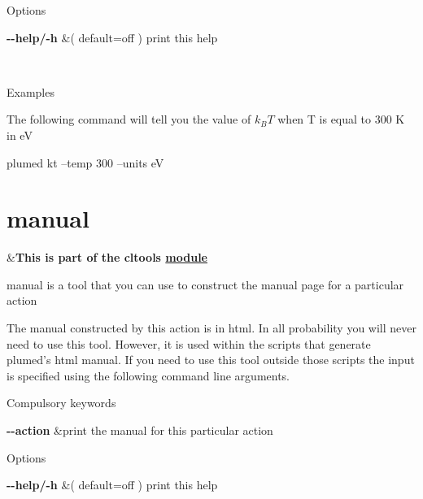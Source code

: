 \begin{DoxyParagraph}{Options}

\end{DoxyParagraph}
\begin{TabularC}{2}
\hline
{\bfseries  {\ttfamily -\/-\/help/-\/h} } &( default=off ) print this help  

\\
\end{TabularC}


\begin{DoxyParagraph}{Examples}

\end{DoxyParagraph}
The following command will tell you the value of $k_BT$ when T is equal to 300 K in e\+V

\begin{DoxyVerb}plumed kt --temp 300 --units eV
\end{DoxyVerb}
 \hypertarget{manual}{}\section{manual}\label{manual}
\begin{TabularC}{2}
\hline
&{\bfseries  This is part of the cltools \hyperlink{mymodules}{module }}   \\
\end{TabularC}
manual is a tool that you can use to construct the manual page for a particular action

The manual constructed by this action is in html. In all probability you will never need to use this tool. However, it is used within the scripts that generate plumed's html manual. If you need to use this tool outside those scripts the input is specified using the following command line arguments.

\begin{DoxyParagraph}{Compulsory keywords}

\end{DoxyParagraph}
\begin{TabularC}{2}
\hline
{\bfseries  {\ttfamily -\/-\/action} } &print the manual for this particular action   \\
\end{TabularC}


\begin{DoxyParagraph}{Options}

\end{DoxyParagraph}
\begin{TabularC}{2}
\hline
{\bfseries  {\ttfamily -\/-\/help/-\/h} } &( default=off ) print this help  

\\
\end{TabularC}


